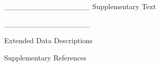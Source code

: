 






________________
Supplementary Text






________________




Extended Data Descriptions


Supplementary References